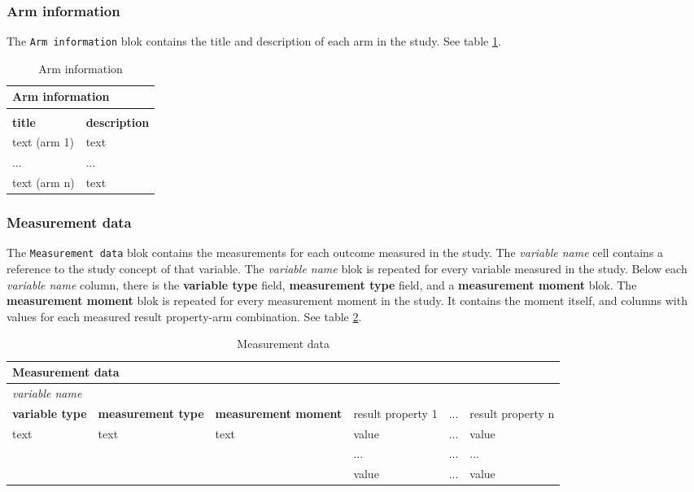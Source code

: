 \documentclass[a4paper,10pt]{article}
\begin{document}
\subsubsection*{Arm information}
The \texttt{Arm information} blok contains the title and description of each arm in the study. See table \ref{table:Arm information}.
\begin{table}[h]
  \centering
  \caption{Arm information}
  \label{table:Arm information}
  \begin{tabular}{|l|l|}
    \hline
    \multicolumn{2}{|l|}{\textbf{Arm information}}  \\ \hline
    \multicolumn{2}{|l|}{}                          \\ \hline
    \textbf{title} & \textbf{description}           \\ \hline
    text (arm 1)& text                              \\ \hline
    ... & ...                                       \\ \hline
    text (arm n)& text                              \\ \hline
  \end{tabular}
\end{table}

\subsubsection*{Measurement data}
The \texttt{Measurement data} blok contains the measurements for each outcome measured in the study. The \textit{variable name} cell contains a reference to the study concept of that variable. The \textit{variable name} blok is repeated for every variable measured in the study. Below each \textit{variable name} column, there is the \textbf{variable type} field, \textbf{measurement type} field, and a \textbf{measurement moment} blok. The \textbf{measurement moment} blok is repeated for every measurement moment in the study. It contains the moment itself, and columns with values for each measured result property-arm combination.
See table \ref{table:Measurement data}.
\begin{table}[h]
  \centering
  \caption{Measurement data}
  \small
  \label{table:Measurement data}
  \begin{tabular}{|l|l|l|l|l|l|}
    \hline
    \multicolumn{6}{|l}{\textbf{Measurement data}}  \\ \hline
    \multicolumn{6}{|l|}{\textit{variable name}}    \\ \hline
    \textbf{variable type} &\textbf{ measurement type} & \textbf{measurement moment} & result property 1 &  ... & result property n \\ \hline
    text & text & text & value & ... & value        \\  \cline{4-6} 
         &      &      & ...   & ... & ...          \\  \cline{4-6} 
         &      &      & value & ... & value        \\ \hline
  \end{tabular}
\end{table}
\end{document}
